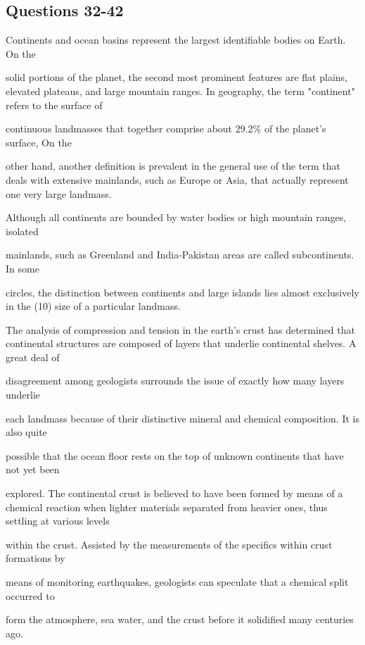 \documentclass[12pt]{article}
\begin{document}
\subsection*{Questions 32-42}
\begingroup
\small
\sloppy
\setlength{\parskip}{0pt}
\setlength{\parindent}{0pt}
Continents and ocean basins represent the largest identifiable bodies on Earth. On the\par
solid portions of the planet, the second most prominent features are flat plains, elevated plateaus, and large mountain ranges. In geography, the term "continent" refers to the surface of\par
continuous landmasses that together comprise about 29.2\% of the planet's surface, On the\par
other hand, another definition is prevalent in the general use of the term that deals with extensive mainlands, such as Europe or Asia, that actually represent one very large landmass.\par
Although all continents are bounded by water bodies or high mountain ranges, isolated\par
mainlands, such as Greenland and India-Pakistan areas are called subcontinents. In some\par
circles, the distinction between continents and large islands lies almost exclusively in the (10) size of a particular landmass.\par
The analysis of compression and tension in the earth's crust has determined that continental structures are composed of layers that underlie continental shelves. A great deal of\par
disagreement among geologists surrounds the issue of exactly how many layers underlie\par
each landmass because of their distinctive mineral and chemical composition. It is also quite\par
possible that the ocean floor rests on the top of unknown continents that have not yet been\par
explored. The continental crust is believed to have been formed by means of a chemical reaction when lighter materials separated from heavier ones, thus settling at various levels\par
within the crust. Assisted by the measurements of the specifics within crust formations by\par
means of monitoring earthquakes, geologists can speculate that a chemical split occurred to\par
form the atmosphere, sea water, and the crust before it solidified many centuries ago.\par
\end{document}
